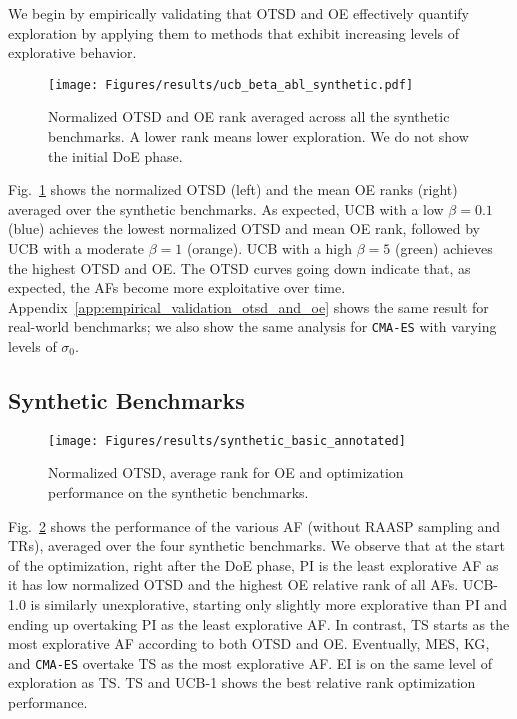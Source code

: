 \documentclass[accepted]{uai2025}
\begin{document}
We begin by empirically validating that \ac{OTSD} and \ac{OE} effectively quantify exploration by applying them to methods that exhibit increasing levels of explorative behavior.
\begin{figure}[tb]
    \centering
    \texttt{[image: Figures/results/ucb\_beta\_abl\_synthetic.pdf]}
    \caption{Normalized \ac{OTSD} and \ac{OE} rank averaged across all the synthetic benchmarks. A lower rank means lower exploration. We do not show the initial \acl{DoE} phase.}
    \label{fig:beta_ablation_ucb}
\end{figure}
Fig.~\ref{fig:beta_ablation_ucb} shows the normalized \ac{OTSD} (left) and the mean \ac{OE} ranks (right)
averaged over the synthetic benchmarks.
As expected, \ac{UCB} with a low $\beta=0.1$ (blue) achieves the lowest normalized \ac{OTSD} and mean \ac{OE} rank, followed by \ac{UCB} with a moderate $\beta=1$ (orange). 
\ac{UCB} with a high $\beta=5$ (green) achieves the highest  \ac{OTSD} and \ac{OE}.
The \ac{OTSD} curves going down indicate that, as expected, the \acp{AF} become more exploitative over time.
Appendix~\ref{app:empirical_validation_otsd_and_oe} shows the same result for real-world benchmarks; we also show the same analysis for \texttt{CMA-ES} with varying levels of $\sigma_0$. 

\subsection{Synthetic Benchmarks}

\begin{figure}[tb]
    \centering
    \texttt{[image: Figures/results/synthetic\_basic\_annotated]}
    \caption{Normalized \ac{OTSD}, average rank for \ac{OE} and optimization performance on the synthetic benchmarks.}
    \label{fig:synthetic_benchmarks_basic_af_conf}
\end{figure}

Fig.~\ref{fig:synthetic_benchmarks_basic_af_conf} shows the performance of the various \ac{AF} (without \ac{RAASP} sampling and \acp{TR}), averaged over the four synthetic benchmarks.
We observe that at the start of the optimization, right after the \ac{DoE} phase, \ac{PI} is the least explorative \ac{AF} as it has low normalized \ac{OTSD} and the highest \ac{OE} relative rank of all \acp{AF}.
\ac{UCB}-1.0 is similarly unexplorative, starting only slightly more explorative than \ac{PI} and ending up overtaking \ac{PI} as the least explorative \ac{AF}.
In contrast, \ac{TS} starts as the most explorative \ac{AF} according to both \ac{OTSD} and \ac{OE}.
Eventually, \ac{MES}, \ac{KG}, and \texttt{CMA-ES} overtake \ac{TS} as the most explorative \ac{AF}.
\ac{EI} is on the same level of exploration as \ac{TS}. %
\ac{TS} and 
\ac{UCB}-1 shows the best relative rank optimization performance.
\end{document}
